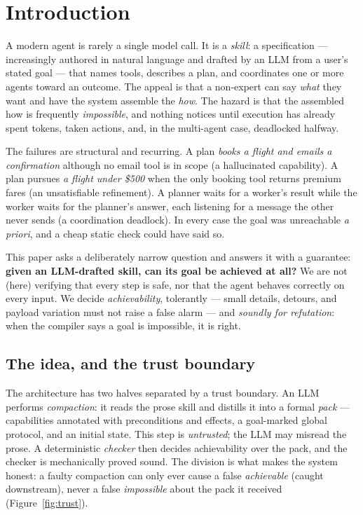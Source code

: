 \documentclass[11pt]{article}
\theoremstyle{plain}
\theoremstyle{definition}
\begin{document}
\section{Introduction}

A modern agent is rarely a single model call. It is a \emph{skill}: a
specification --- increasingly authored in natural language and drafted by an LLM
from a user's stated goal --- that names tools, describes a plan, and coordinates
one or more agents toward an outcome. The appeal is that a non-expert can say
\emph{what} they want and have the system assemble the \emph{how}. The hazard is
that the assembled how is frequently \emph{impossible}, and nothing notices until
execution has already spent tokens, taken actions, and, in the multi-agent case,
deadlocked halfway.

The failures are structural and recurring. A plan \emph{books a flight and emails
a confirmation} although no email tool is in scope (a hallucinated capability). A
plan pursues \emph{a flight under \$500} when the only booking tool returns
premium fares (an unsatisfiable refinement). A planner waits for a worker's result
while the worker waits for the planner's answer, each listening for a message the
other never sends (a coordination deadlock). In every case the goal was unreachable
\emph{a priori}, and a cheap static check could have said so.

This paper asks a deliberately narrow question and answers it with a guarantee:
\textbf{given an LLM-drafted skill, can its goal be achieved at all?} We are not
(here) verifying that every step is safe, nor that the agent behaves correctly on
every input. We decide \emph{achievability}, tolerantly --- small details, detours,
and payload variation must not raise a false alarm --- and \emph{soundly for
refutation}: when the compiler says a goal is impossible, it is right.

\subsection{The idea, and the trust boundary}

The architecture has two halves separated by a trust boundary. An LLM performs
\emph{compaction}: it reads the prose skill and distills it into a formal
\emph{pack} --- capabilities annotated with preconditions and effects, a
goal-marked global protocol, and an initial state. This step is \emph{untrusted};
the LLM may misread the prose. A deterministic \emph{checker} then decides
achievability over the pack, and the checker is mechanically proved sound. The
division is what makes the system honest: a faulty compaction can only ever cause
a false \emph{achievable} (caught downstream), never a false \emph{impossible}
about the pack it received (Figure~\ref{fig:trust}).
\end{document}
